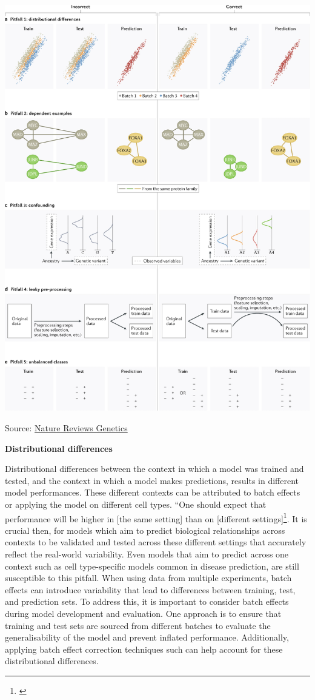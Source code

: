 \documentclass[
]{book}
\begin{document}
\includegraphics{images/pitfalls.png}

Source: \href{https://www.nature.com/articles/s41576-021-00434-9/figures/1}{Nature Reviews Genetics}

\textbf{Distributional differences}

Distributional differences between the context in which a model was trained and tested, and the context in which a model makes predictions, results in different model performances. These different contexts can be attributed to batch effects or applying the model on different cell types. ``One should expect that performance will be higher in {[}the same setting{]} than on {[}different settings{]}\footnote{\citet{whalen2022}}. It is crucial then, for models which aim to predict biological relationships across contexts to be validated and tested across these different settings that accurately reflect the real-world variability. Even models that aim to predict across one context such as cell type-specific models common in disease prediction, are still susceptible to this pitfall. When using data from multiple experiments, batch effects can introduce variability that lead to differences between training, test, and prediction sets. To address this, it is important to consider batch effects during model development and evaluation. One approach is to ensure that training and test sets are sourced from different batches to evaluate the generalisability of the model and prevent inflated performance. Additionally, applying batch effect correction techniques such can help account for these distributional differences.
\end{document}
